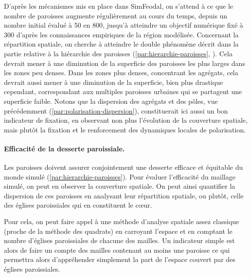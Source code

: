 D'après les mécanismes mis en place dans SimFeodal, on s'attend à ce que le nombre de paroisses augmente régulièrement au cours du temps, depuis un nombre initial évalué à 50 en 800, jusqu'à atteindre un objectif numérique fixé à 300 d'après les connaissances empiriques de la région modélisée.
Concernant la répartition spatiale, on cherche à atteindre le double phénomène décrit dans la partie relative à la hiérarchie des paroisses (\cref{par:hierarchie-paroisses}, \pageref{par:hierarchie-paroisses}).
Cela devrait mener à une diminution de la superficie des paroisses les plus larges dans les zones peu denses.
Dans les zones plus denses, concentrant les agrégats, cela devrait aussi mener à une diminution de la superficie, bien plus drastique cependant, correspondant aux multiples paroisses \og urbaines\fg{} qui se partagent une superficie faible.
Notons que la dispersion des agrégats et des pôles, vue précédemment (\ref{par:polarisation-dispersion}), constituerait ici aussi un bon indicateur de fixation, en observant non plus l'évolution de la couverture spatiale, mais plutôt la fixation et le renforcement des dynamiques locales de polarisation.

\paragraph{Efficacité de la desserte paroissiale.}

Les paroisses doivent assurer conjointement une desserte efficace et équitable du monde simulé (\cref{par:hierarchie-paroisses}).
Pour évaluer l'efficacité du maillage simulé, on peut en observer la couverture spatiale.
On peut ainsi quantifier la dispersion de ces paroisses en analysant leur répartition spatiale, ou plutôt, celle des églises paroissiales qui en constituent le cœur.

Pour cela, on peut faire appel à une méthode d'analyse spatiale assez classique (proche de la méthode des quadrats) en carroyant l'espace et en comptant le nombre d'églises paroissiales de chacune des mailles.
Un indicateur simple est alors de faire un compte des mailles contenant au moins une paroisse ce qui permettra alors d'appréhender simplement la part de l'espace couvert par des églises paroissiales.

